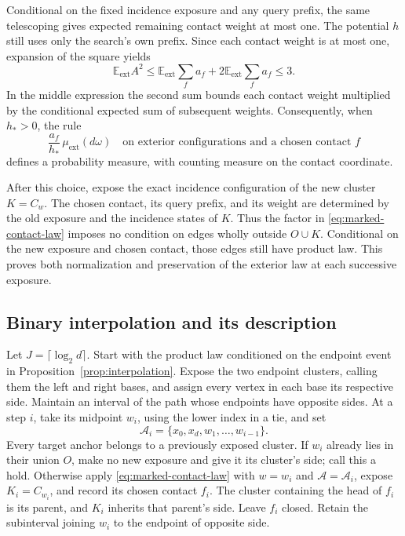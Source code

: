 \documentclass[11pt]{article}
\theoremstyle{definition}
\newcommand{\EE}{\mathbb E}
\begin{document}
Conditional on the fixed incidence exposure and any query prefix, the
same telescoping gives expected remaining contact weight at most one.
The potential $h$ still uses only the search's own prefix. Since each
contact weight is at most one,
expansion of the square yields
\begin{equation}\label{eq:contact-second-moment}
 \EE_{\mathrm{ext}}A^2
 \le \EE_{\mathrm{ext}}\sum_f a_f
       +2\EE_{\mathrm{ext}}\sum_f a_f
 \le3.
\end{equation}
In the middle expression the second sum bounds each contact weight
multiplied by the conditional expected sum of subsequent weights.
Consequently, when $h_*>0$, the rule
\begin{equation}\label{eq:marked-contact-law}
 \frac{a_f}{h_*}\,\mu_{\mathrm{ext}}(d\omega)
 \quad\text{on exterior configurations and a chosen contact }f
\end{equation}
defines a probability measure, with counting measure on the contact
coordinate.

After this choice, expose the exact incidence configuration of the
new cluster $K=C_w$. The chosen contact, its query prefix, and its
weight are determined by the old exposure and the incidence states of
$K$. Thus the factor in \eqref{eq:marked-contact-law} imposes no
condition on edges wholly outside $O\cup K$. Conditional on the new
exposure and chosen contact, those edges still have product law.
This proves both normalization and preservation of the exterior law
at each successive exposure.

\subsection{Binary interpolation and its description}

Let $J=\lceil\log_2d\rceil$. Start with the product law conditioned
on the endpoint event in Proposition~\ref{prop:interpolation}. Expose
the two endpoint clusters, calling them the left and right bases, and
assign every vertex in each base its respective side.
Maintain an interval of the path whose endpoints have opposite sides.
At a step $i$, take its midpoint $w_i$, using the lower index in a tie,
and set
\[
 \mathcal A_i=\{x_0,x_d,w_1,\ldots,w_{i-1}\}.
\]
Every target anchor belongs to a previously exposed cluster. If $w_i$
already lies in their union $O$, make no new exposure and give it its
cluster's side; call this a hold. Otherwise apply
\eqref{eq:marked-contact-law} with $w=w_i$ and
$\mathcal A=\mathcal A_i$, expose $K_i=C_{w_i}$, and record its
chosen contact $f_i$. The cluster containing the head of $f_i$ is its
parent, and $K_i$ inherits that parent's side. Leave $f_i$ closed.
Retain the subinterval joining $w_i$ to the endpoint of opposite side.
\end{document}
